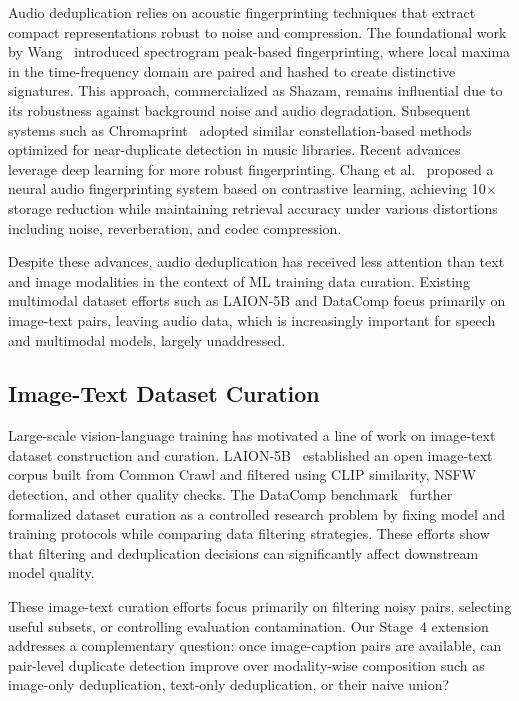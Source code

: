 \documentclass[conference]{IEEEtran}
\begin{document}
Audio deduplication relies on acoustic fingerprinting techniques that extract compact representations robust to noise and compression. The foundational work by Wang~\cite{wang2003industrial} introduced spectrogram peak-based fingerprinting, where local maxima in the time-frequency domain are paired and hashed to create distinctive signatures. This approach, commercialized as Shazam, remains influential due to its robustness against background noise and audio degradation. Subsequent systems such as Chromaprint~\cite{chromaprint} adopted similar constellation-based methods optimized for near-duplicate detection in music libraries. Recent advances leverage deep learning for more robust fingerprinting. Chang et al.~\cite{chang2021neural} proposed a neural audio fingerprinting system based on contrastive learning, achieving 10$\times$ storage reduction while maintaining retrieval accuracy under various distortions including noise, reverberation, and codec compression.  

Despite these advances, audio deduplication has received less attention than text and image modalities in the context of ML training data curation. Existing multimodal dataset efforts such as LAION-5B and DataComp focus primarily on image-text pairs, leaving audio data, which is increasingly important for speech and multimodal models, largely unaddressed.

\subsection{Image-Text Dataset Curation}

Large-scale vision-language training has motivated a line of work on image-text dataset construction and curation. LAION-5B~\cite{schuhmann2022laion} established an open image-text corpus built from Common Crawl and filtered using CLIP similarity, NSFW detection, and other quality checks. The DataComp benchmark~\cite{gadre2023datacomp} further formalized dataset curation as a controlled research problem by fixing model and training protocols while comparing data filtering strategies. These efforts show that filtering and deduplication decisions can significantly affect downstream model quality.

These image-text curation efforts focus primarily on filtering noisy pairs, selecting useful subsets, or controlling evaluation contamination. Our Stage~4 extension addresses a complementary question: once image-caption pairs are available, can pair-level duplicate detection improve over modality-wise composition such as image-only deduplication, text-only deduplication, or their naive union?
\end{document}
